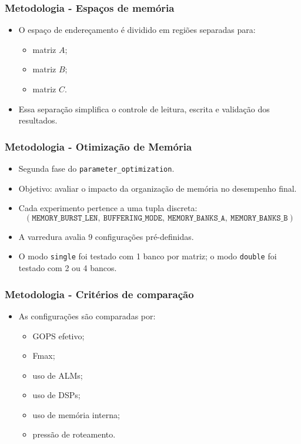 \documentclass{beamer}
\begin{document}
\begin{frame}
\frametitle{Metodologia - Espaços de memória}

\begin{itemize}
    \item O espaço de endereçamento é dividido em regiões separadas para:
    \begin{itemize}
        \item matriz \(A\);
        \item matriz \(B\);
        \item matriz \(C\).
    \end{itemize}
    \item Essa separação simplifica o controle de leitura, escrita e validação dos resultados.
\end{itemize}

\end{frame}

\begin{frame}
\frametitle{Metodologia - Otimização de Memória}

\begin{itemize}
    \item Segunda fase do \texttt{parameter\_optimization}.
    \item Objetivo: avaliar o impacto da organização de memória no desempenho final.
    \item Cada experimento pertence a uma tupla discreta:
    \[
        (\texttt{MEMORY\_BURST\_LEN},\ \texttt{BUFFERING\_MODE},\ 
        \texttt{MEMORY\_BANKS\_A},\ \texttt{MEMORY\_BANKS\_B})
    \]
    \item A varredura avalia 9 configurações pré-definidas.
    \item O modo \texttt{single} foi testado com 1 banco por matriz; o modo \texttt{double} foi testado com 2 ou 4 bancos.
\end{itemize}

\end{frame}

\begin{frame}
\frametitle{Metodologia - Critérios de comparação}

\begin{itemize}
    \item As configurações são comparadas por:
    \begin{itemize}
        \item GOPS efetivo;
        \item Fmax;
        \item uso de ALMs;
        \item uso de DSPs;
        \item uso de memória interna;
        \item pressão de roteamento.
    \end{itemize}
\end{itemize}

\end{frame}
\end{document}

